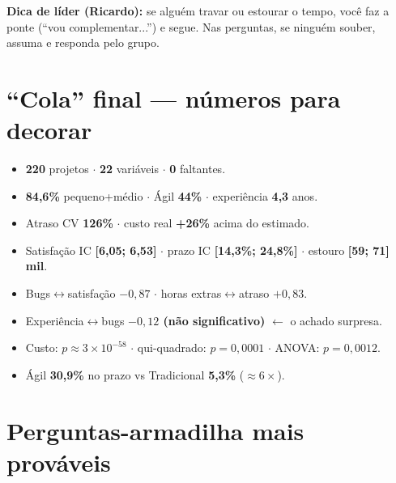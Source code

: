 \documentclass[a4paper, 11pt]{article}
\begin{document}
\begin{fala}
\textbf{Dica de líder (Ricardo):} se alguém travar ou estourar o tempo, você faz a ponte (``vou
complementar...'') e segue. Nas perguntas, se ninguém souber, assuma e responda pelo grupo.
\end{fala}

\section{``Cola'' final --- números para decorar}
\label{sec:cola}

\begin{fala}
\begin{itemize}[noitemsep]
	\item \textbf{220} projetos $\cdot$ \textbf{22} variáveis $\cdot$ \textbf{0} faltantes.
	\item \textbf{84,6\%} pequeno+médio $\cdot$ Ágil \textbf{44\%} $\cdot$ experiência \textbf{4,3} anos.
	\item Atraso CV \textbf{126\%} $\cdot$ custo real \textbf{+26\%} acima do estimado.
	\item Satisfação IC \textbf{[6,05; 6,53]} $\cdot$ prazo IC \textbf{[14,3\%; 24,8\%]} $\cdot$ estouro \textbf{[59; 71] mil}.
	\item Bugs$\leftrightarrow$satisfação \textbf{$-0{,}87$} $\cdot$ horas extras$\leftrightarrow$atraso \textbf{$+0{,}83$}.
	\item Experiência$\leftrightarrow$bugs \textbf{$-0{,}12$ (não significativo)} $\leftarrow$ o achado surpresa.
	\item Custo: $p\approx 3\times10^{-58}$ $\cdot$ qui-quadrado: $p=0{,}0001$ $\cdot$ ANOVA: $p=0{,}0012$.
	\item Ágil \textbf{30,9\%} no prazo vs Tradicional \textbf{5,3\%} ($\approx 6\times$).
\end{itemize}
\end{fala}

\section{Perguntas-armadilha mais prováveis}
\end{document}

